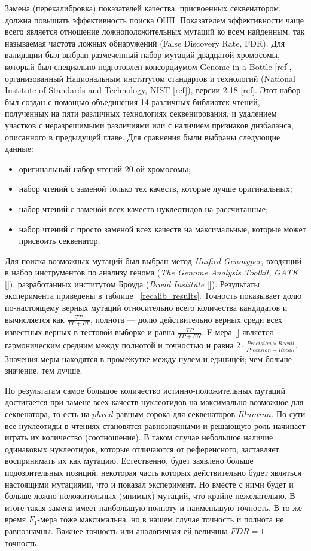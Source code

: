 	Замена (перекалибровка) показателей качества, присвоенных секвенатором, должна повышать эффективность поиска ОНП. Показателем эффективности чаще всего является отношение ложноположительных мутаций ко всем найденным, так называемая частота ложных обнаружений (False Discovery Rate, FDR). Для валидации был выбран размеченный набор мутаций двадцатой хромосомы, который был специально подготовлен консорциумом Genome in a Bottle [ref], организованный Национальным институтом стандартов и технологий (National Institute of Standards and Technology, NIST [ref]), версии 2.18 [ref]. Этот набор был создан с помощью объединения 14 различных библиотек чтений, полученных на пяти различных технологиях секвенирования, и удалением участков с неразрешимыми различиями или с наличием признаков дизбаланса, описанного в предыдущей главе.
	Для сравнения были выбраны следующие данные:
\begin{itemize}
\item оригинальный набор чтений 20-ой хромосомы;
\item набор чтений с заменой только тех качеств, которые лучше оригинальных;
\item набор чтений с заменой всех качеств нуклеотидов на рассчитанные;
\item набор чтений с просто заменой всех качеств на максимальные, которые может присвоить секвенатор.
\end{itemize}	
	Для поиска возможных мутаций был выбран метод \emph{Unified Genotyper}, входящий в набор инструментов по анализу генома (\emph{The Genome Analysis Toolkit}, \emph{GATK} []), разработанных институтом Броуда (\emph{Broad Institute} []).
	Результаты эксперимента приведены в таблице ~\ref{recalib_results}. Точность показывает долю по-настоящему верных мутаций относительно всего количества кандидатов и вычисляется как $\frac {TP} {TP + FP}$, полнота --- долю действительно верных среди всех известных верных в тестовой выборке и равна $\frac {TP} {TP + FN}$. F-мера [] является гармоническим средним между полнотой и точностью и равна $ 2 \cdot \frac {{Precision} \times {Recall}} {{Precision} + {Recall}}$. Значения меры находятся в промежутке между нулем и единицей; чем больше значение, тем лучше.

По результатам самое большое количество истинно-положительных мутаций достигается при замене всех качеств нуклеотидов на максимально возможное для секвенатора, то есть на $phred$ равным сорока для секвенаторов $Illumina$. По сути все нуклеотиды в чтениях становятся равнозначными и решающую роль начинает играть их количество (соотношение). В таком случае небольшое наличие одинаковых нуклеотидов, которые отличаются от референсного, заставляет воспринимать их как мутацию. Естественно, будет заявлено больше подозрительных позиций, некоторая часть которых действительно будет являться настоящими мутациями, что и показал эксперимент. Но вместе с ними будет и больше ложно-положительных (мнимых) мутаций, что крайне нежелательно. В итоге такая замена имеет наибольшую полноту и наименьшую точность. В то же время $F_1$-мера тоже максимальна, но в нашем случае точность и полнота не равнозначны. Важнее точность или аналогичная ей величина $ FDR = 1 - $ точность.

